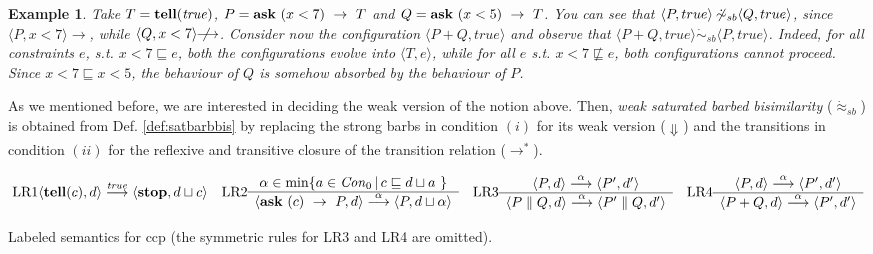 \documentclass[copyright,creativecommons]{eptcs}
\newcommand{\tellp}[1]{\tell(#1)}
\newcommand{\askp}[2]{\ask \  #1 \  \rightarrow \ #2}
\newcommand{\true}{{\it true}}
\newcommand{\ask}{{\bf ask}}
\newcommand{\tell}{{\bf tell}}
\newcommand{\Stop}{{\bf stop}}
\newcommand{\rrarrow}{\longrightarrow}
\newcommand{\Con}{\mathit{Con}}
\newcommand{\pairccp}[2]{\langle #1,#2 \rangle}
\newcommand{\trans}[1]{\stackrel{#1}{\rrarrow}}
\newcommand{\tr}[1]{\trans{#1}}
\newcommand{\wbarb}[1]{\Downarrow_{#1}}
\newcommand{\satbis}{\dot{\sim}_{sb}}
\newcommand{\wsatbis}{\dot{\approx}_{sb}}
\newcommand{\bigfrac}[2]{
\begin{array}{c}#1\\
\hline #2
\end{array}}
\newtheorem{example}{Example}
\newcommand{\reds}{\rrarrow^*}
\begin{document}
\begin{example} \label{ex:satbarbbis1}
Take $T=\tellp{\true}$, $P=\askp{(x<7)}{T}$ and $Q=\askp{(x<5)}{T}$. You can see that
$\pairccp{P}{true} \not \!\! \satbis \pairccp{Q}{true}$, since $\pairccp{P}{x<7} \tr{}$, while
$\pairccp{Q}{x<7} \not \! \! \tr{}$. Consider now the configuration $\pairccp{P+Q}{true}$ and
observe that $\pairccp{P+Q}{true} \satbis \pairccp{P}{true}$. Indeed, for all constraints $e$, s.t.
$x<7 \sqsubseteq e$, both the configurations evolve into $\pairccp{T}{e}$, while for all $e$ s.t.
$x<7 \not \sqsubseteq e$, both configurations cannot proceed. Since $x<7 \sqsubseteq x<5$,
the behaviour of $Q$ is somehow absorbed by the behaviour of $P$.
\end{example}


As we mentioned before, we are interested in deciding the weak version of the notion above.
Then, \emph{weak saturated barbed bisimilarity} ($\wsatbis$) is obtained from
Def. \ref{def:satbarbbis} by replacing the strong barbs
in condition $(i)$ for its weak version ($\wbarb{}$) and the transitions in condition $(ii)$
for the reflexive and transitive closure of the transition relation ($\reds$).








\begin{table}[t!]
{\scriptsize
$$
\makebox{LR1}\pairccp{\tellp{c}}{d} \trans{\true}
\pairccp{\Stop}{d \sqcup c} \quad
\makebox{LR2}\bigfrac{\alpha \in \min \{a\in \Con_0 \, | \, c
\sqsubseteq d \sqcup a \ \}} {\pairccp{\askp{(c)}{P}}{d}
\trans{\alpha} \pairccp{P}{d \sqcup \alpha}} \quad
\makebox{LR3}
\bigfrac{\pairccp{P}{d} \trans{\alpha} \pairccp{P'}{d'}}
{\pairccp{P\parallel Q}{d} \trans{\alpha} \pairccp{P'\parallel
Q}{d'}} \quad
\makebox{LR4}
\bigfrac{\pairccp{P}{d} \trans{\alpha} \pairccp{P'}{d'}}
{\pairccp{P + Q}{d} \trans{\alpha} \pairccp{P'}{d'}}
$$


}
\caption{Labeled semantics for ccp (the symmetric rules for LR3 and LR4 are omitted).}\label{tab:labsem}
\end{table}
\end{document}
